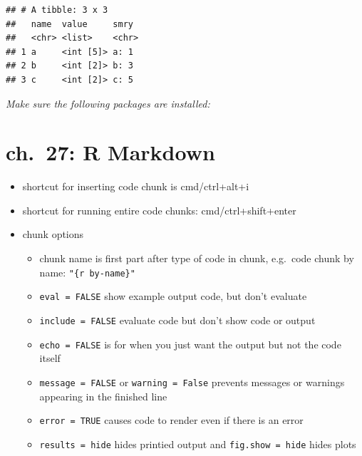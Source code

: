\documentclass[]{book}
\providecommand{\tightlist}{%
  \setlength{\itemsep}{0pt}\setlength{\parskip}{0pt}}
\theoremstyle{definition}
\theoremstyle{definition}
\theoremstyle{definition}
\theoremstyle{remark}
\begin{document}
\begin{verbatim}
## # A tibble: 3 x 3
##   name  value     smry 
##   <chr> <list>    <chr>
## 1 a     <int [5]> a: 1 
## 2 b     <int [2]> b: 3 
## 3 c     <int [2]> c: 5
\end{verbatim}

\emph{Make sure the following packages are installed:}

\hypertarget{ch.-27-r-markdown}{%
\chapter{ch.~27: R Markdown}\label{ch.-27-r-markdown}}

\begin{itemize}
\tightlist
\item
  shortcut for inserting code chunk is cmd/ctrl+alt+i
\item
  shortcut for running entire code chunks: cmd/ctrl+shift+enter
\item
  chunk options

  \begin{itemize}
  \tightlist
  \item
    chunk name is first part after type of code in chunk, e.g.~code
    chunk by name:
    \texttt{"\textasciigrave{}\textasciigrave{}\textasciigrave{}\{r\ by-name\}"}
  \item
    \texttt{eval\ =\ FALSE} show example output code, but don't evaluate
  \item
    \texttt{include\ =\ FALSE} evaluate code but don't show code or
    output
  \item
    \texttt{echo\ =\ FALSE} is for when you just want the output but not
    the code itself
  \item
    \texttt{message\ =\ FALSE} or \texttt{warning\ =\ False} prevents
    messages or warnings appearing in the finished line
  \item
    \texttt{error\ =\ TRUE} causes code to render even if there is an
    error
  \item
    \texttt{results\ =\ \textquotesingle{}hide\textquotesingle{}} hides
    printied output and
    \texttt{fig.show\ =\ \textquotesingle{}hide\textquotesingle{}} hides
    plots


\end{itemize}
\end{itemize}
\end{document}
